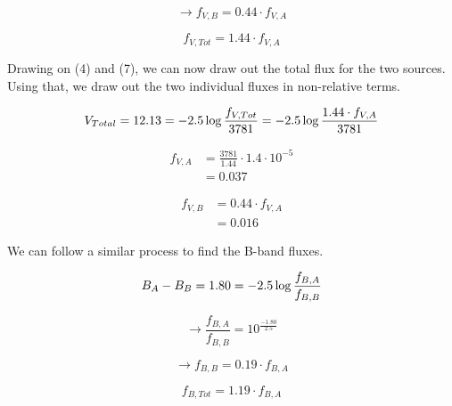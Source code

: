 \documentclass[12pt]{article}
\newenvironment{answer}[2][Answer]{\begin{trivlist}
\item[\hskip \labelsep {\bfseries #1}\hskip \labelsep {\bfseries #2.}]}{\end{trivlist}}
\begin{document}
\begin{answer}{2}
    $$ \rightarrow f_{V,B} = 0.44 \cdot f_{V,A} $$

  \begin{equation}
    f_{V, Tot} = 1.44 \cdot f_{V,A}
  \end{equation}




  Drawing on (4) and (7), we can now draw out the total flux for the two sources. Using that, we draw out the two individual fluxes in non-relative terms.

  $$  V_{Total}  = 12.13  = -2.5 \log{\frac{f_{V, Tot}}{3781}} \\
               = -2.5 \log{\frac{1.44 \cdot f_{V,A}}{3781}} $$

  \begin{equation}
    \begin{align}
    f_{V,A} & = \frac{3781}{1.44} \cdot 1.4 \cdot 10^{-5} \\
            & = 0.037
    \end{align}
  \end{equation}

  \begin{equation}
    \begin{align}
      f_{V,B} & = 0.44 \cdot f_{V,A} \\
              & = 0.016
    \end{align}
  \end{equation}

  We can follow a similar process to find the B-band fluxes.

  \begin{equation}
    B_{A} - B_{B} = 1.80 = -2.5 \log{\frac{f_{B,A}}{f_{B,B}}} \\
  \end{equation}

    $$ \rightarrow \frac{f_{B,A}}{f_{B,B}} = 10^{\frac{-1.80}{2.5}} $$

  $$ \rightarrow f_{B,B} = 0.19 \cdot f_{B,A} $$

  \begin{equation}
    f_{B, Tot} = 1.19 \cdot f_{B,A}
  \end{equation}



\end{answer}
\end{document}

